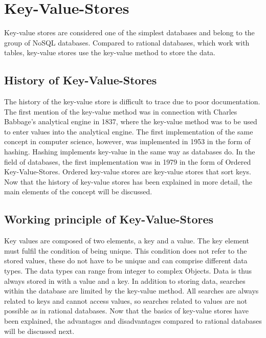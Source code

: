 
\section{Key-Value-Stores}

Key-value stores are considered one of the simplest databases and belong to the
group of NoSQL databases. Compared to rational databases, which work with
tables, key-value stores use the key-value method to store the data.
\parencite{Key_Value_Datastore_Hazelcast}


\subsection{History of Key-Value-Stores}

The history of the key-value store is difficult to trace due to poor
documentation. The first mention of the key-value method was in connection with
Charles Babbage's analytical engine in 1837, where the key-value method was to
be used to enter values into the analytical engine. The first implementation of
the same concept in computer science, however, was implemented in 1953 in the
form of hashing. Hashing implements key-value in the same way as databases do.
In the field of databases, the first implementation was in 1979 in the form of
Ordered Key-Value-Stores. Ordered key-value stores are key-value stores that
sort keys. Now that the history of key-value stores has been explained in more
detail, the main elements of the concept will be
discussed. \parencite{babge_table_cards, hash_table_history,
ordered_key_value_history}

\subsection{Working principle of Key-Value-Stores}

Key values are composed of two elements, a key and a value. The key element must
fulfil the condition of being unique. This condition does not refer to the
stored values, these do not have to be unique and can comprise different data
types. The data types can range from integer to complex Objects. Data is thus
always stored in with a value and a key. In addition to storing data, searches
within the database are limited by the key-value method. All searches are always
related to keys and cannot access values, so searches related to values are not
possible as in rational databases. Now that the basics of key-value stores have
been explained, the advantages and disadvantages compared to rational databases
will be discussed next. \parencite{Key_Value_Datastore_Hazelcast,
Key_Value_Datastore}


